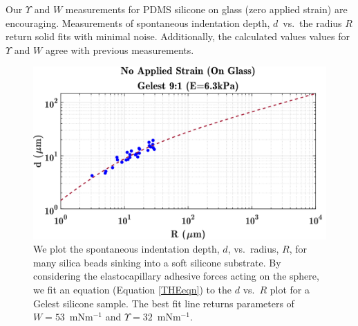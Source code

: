 Our $ \Upsilon $ and $ W $ measurements for PDMS silicone on glass (zero applied strain) are encouraging. Measurements of spontaneous indentation depth, $ d $~vs.~the radius $ R $ return solid fits with minimal noise. Additionally, the calculated values values for $ \Upsilon $ and $ W $ agree with previous measurements. 

\begin{figure}[h!]
	\centering
	\includegraphics[width=\linewidth]{Chapters/Figures/w_ups_fit_G9-1}
	\caption[Gelest W-$\Upsilon$ Fit]{We plot the spontaneous indentation depth, $ d $, vs.~radius, $ R $, for many silica beads sinking into a soft silicone substrate. By considering the elastocapillary adhesive forces acting on the sphere, we fit an equation (Equation \ref{THEeqn}) to the $ d $ vs.~$R$ plot for a Gelest silicone sample. The best fit line returns parameters of $ W=53 $~mNm$^{-1}$  and $ \Upsilon=32 $~mNm$^{-1}$.}
	\label{fig:wupsfitg9-1}
\end{figure}


